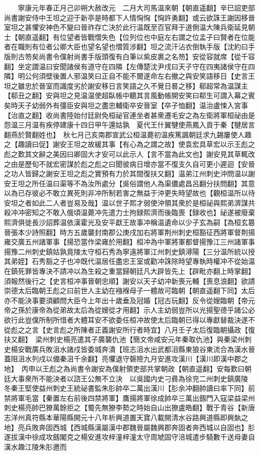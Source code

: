 　　寧康元年春正月己卯朔大赦改元　二月大司馬温來朝【朝直遥翻】辛巳詔吏部尚書謝安侍中王坦之迎于新亭是時都下人情恟恟【恟許勇翻】或云欲誅王謝因移晉室坦之甚懼安神色不變曰晉祚存亡決於此行温既至百官拜于道側温大陳兵衛延見朝士【朝直遥翻】有位望者皆戰慴失色【位列位也中庭左右謂之位孟子曰賢者在位能者在職則有位者公卿大臣也望名望也慴質涉翻】坦之流汗沾衣倒執手版【沈約曰手版則古笏矣尚書令僕射尚書手版頭復有白筆以紫皮裹之名笏】安從容就席【從千容翻】坐定謂温曰安聞諸侯有道守在四隣【左傳楚沈尹戌曰天子守在四夷諸侯守在四隣】明公何須壁後置人邪温笑曰正自不能不爾遂命左右撤之與安笑語移日【史言王坦之雖忠於晉室而識度劣於謝安移日言笑語之久不覺日晷之移】郗超常為温謀主【郗丑之翻】安與坦之見温温使超臥帳中聽其言風動帳開安笑曰郗生可謂入幕之賓矣時天子幼弱外有彊臣安與坦之盡忠輔衛卒安晉室【卒子恤翻】温治盧悚入宮事【治直之翻】收尚書陸始付廷尉免桓祕官連坐者甚衆遷毛安之為左衛將軍桓祕由是怨温三月温有疾停建康十四日甲午還姑孰　夏代王什翼犍使燕鳳入貢于秦【犍居言翻燕於賢翻姓也】　秋七月己亥南郡宣武公桓温薨初温疾篤諷朝廷求九錫屢使人趣之【趣讀曰促】謝安王坦之故緩其事【有心為之謂之故】使袁宏具草宏以示王彪之彪之歎其文辭之美因曰卿固大才安可以此示人【言不當為此文也】謝安見其草輒改之由是歷旬不就宏密謀於彪之彪之曰聞彼病日增亦當不復支久自可更小遲迴【安晉之功人皆歸之謝安王坦之彪之實預有力於其間復扶又翻】温弟江州刺史沖問温以謝安王坦之所任温曰渠等不為汝所處分【吳俗謂他人為渠儂處昌呂翻分扶問翻】其意以為已存彼必不敢立異死則非冲所制若害之無益于沖更失時望故也【觀桓温所以待安坦之者如此二人者豈易及哉】温以世子熙才弱使沖領其衆於是桓祕與熙弟濟謀共殺冲冲密知之不敢入俄頃温薨冲先遣力士拘録熙濟而後臨喪【録收也】祕遂被廢棄熙濟俱徙長沙詔葬温依漢霍光及安平獻王故事冲稱温遺命以少子玄為嗣【為桓玄簒晉張本少詩照翻】時方五歲襲封南郡公庚戌加右將軍荆州刺史桓豁征西將軍督荆揚雍交廣五州諸軍事【揚恐當作梁雍於用翻】桓冲為中軍將軍都督揚豫江三州諸軍事揚豫二州刺史鎮姑孰竟陵太守桓石秀為寧遠將軍江州刺史鎮潯陽【三分温所統以授其弟姪】石秀豁之子也冲既代温居任盡忠王室或勸冲誅除時望專執時權冲不從始温在鎮死罪皆專決不請冲以為生殺之重當歸朝廷凡大辟皆先上【辟毗亦翻上時掌翻】須報然後行之【史言桓冲事晉朝忠順】謝安以天子幼冲新喪元輔【喪息浪翻】欲請崇德太后臨朝王彪之曰前世人主幼在襁褓母子一體故可臨朝【朝直遥翻下同】太后亦不能決事要須顧問大臣今上年出十歲垂及冠婚【冠古玩翻】反令從嫂臨朝【帝元帝之孫於康帝為從弟故太后為從嫂從才用翻】示人主幼弱豈所以光揚聖德乎諸公必欲行此豈僕所制所惜者大體耳安不欲委任桓冲故使太后臨朝已得以專獻替裁決遂不從彪之之言【史言彪之所陳者正義謝安所行者時宜】八月壬子太后復臨朝攝政【復扶又翻】　梁州刺史楊亮遣其子廣襲仇池【簡文帝咸安元年秦取仇池】與秦梁州刺史楊安戰廣兵敗沮水諸戍皆委城奔潰【班志沮水出武都沮縣東狼谷東流合為漢水晉蓋阻沮水列戍以備秦沮千余翻】亮懼退守磬險九月安進攻漢川【漢川即漢中郡之地】　丙申以王彪之為尚書令謝安為僕射領吏部共掌朝政【朝直遥翻】安每歎曰朝廷大事衆所不能決者以諮王公無不立決　以吳國内史刁彞為徐兖二州刺史鎮廣陵　冬秦王堅使益州刺史王統祕書監朱肜帥卒二萬出漢川【肜余冲翻帥讀曰率下同】前禁將軍毛當【秦置左右前後四禁將軍】鷹揚將軍徐成帥卒三萬出劔門入寇梁益梁州刺史楊亮帥巴獠萬餘拒之【蜀先無獠李勢之時始自山出獠盧皓翻】戰于青谷【新唐志洋州真符縣本華陽縣開元十八年析興道置天寶八載開清水谷路興道縣即興埶之地】亮兵敗奔固西城【西城縣漢屬漢中郡魏晉屬魏興郡奔固者奔西城以自固也】肜遂拔漢中徐成攻劔閣克之楊安進攻梓潼梓潼太守周虓固守涪城遣步騎數千送母妻自漢水趣江陵朱肜邀而